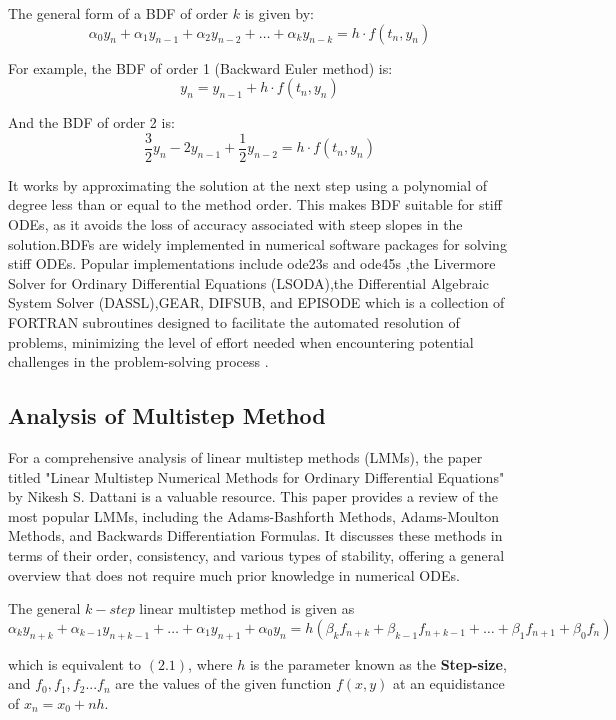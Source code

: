 The general form of a BDF of order \(k\) is given by:
\[
\alpha_0 y_n + \alpha_1 y_{n-1} + \alpha_2 y_{n-2} + \ldots + \alpha_k y_{n-k} = h \cdot f(t_n, y_n)
\]

For example, the BDF of order 1 (Backward Euler method) is:
\[
y_n = y_{n-1} + h \cdot f(t_n, y_n)
\]

And the BDF of order 2 is:
\[
\frac{3}{2} y_n - 2y_{n-1} + \frac{1}{2} y_{n-2} = h \cdot f(t_n, y_n)
\]

It works by approximating the solution at the next step using a polynomial of degree less than or equal to the method order. This makes BDF suitable for stiff ODEs, as it avoids the loss of accuracy associated with steep slopes in the solution.BDFs are widely implemented in numerical software packages for solving stiff ODEs. Popular implementations include ode23s and ode45s \cite{shampine1997matlab},the Livermore Solver for Ordinary Differential Equations (LSODA),the Differential Algebraic System Solver (DASSL),GEAR, DIFSUB, and EPISODE \cite{Yatim2013} which is a collection of FORTRAN subroutines designed to facilitate the automated resolution of problems, minimizing the level of effort needed when encountering potential challenges in the problem-solving process \cite{thohura2013numerical}.


\subsection{Analysis of Multistep Method}

For a comprehensive analysis of linear multistep methods (LMMs), the paper titled "Linear Multistep Numerical Methods for Ordinary Differential Equations" by Nikesh S. Dattani is a valuable resource. This paper provides a review of the most popular LMMs, including the Adams-Bashforth Methods, Adams-Moulton Methods, and Backwards Differentiation Formulas. It discusses these methods in terms of their order, consistency, and various types of stability, offering a general overview that does not require much prior knowledge in numerical ODEs\cite{dattani2008linear}.

The general $k-step$ linear multistep method is given as 
\begin{equation}
  \alpha_k y_{n+k} + \alpha_{k-1} y_{n+k-1} + \ldots + \alpha_1 y_{n+1} + \alpha_0 y_n = h \left( \beta_k f_{n+k} + \beta_{k-1} f_{n+k-1} + \ldots + \beta_1 f_{n+1} + \beta_0 f_n \right)
\end{equation}

 which is equivalent to $(2.1)$, where $h$ is the parameter known as the \textbf{Step-size}, and $f_0, f_1, f_2 ... f_n$ are the values of the given function $f(x,y)$ at an equidistance of  $x_n = x_0 + nh$.

